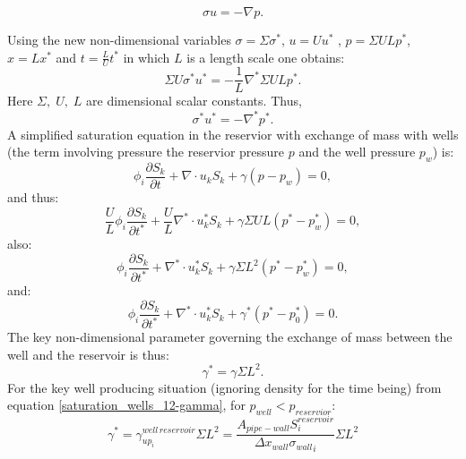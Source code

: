 \begin{equation}
\sigma u = -\nabla p.
\end{equation}

Using the new non-dimensional variables $\sigma=\Sigma \sigma^*$, $u=U u^*$ , $p=\Sigma U L p^*$,
$x=L x^*$
and $t=\frac{L}{U} t^*$ in which $L$ is a length scale
one
obtains:
\begin{equation}
\Sigma U \sigma^* u^* = -\frac{1}{L} \nabla^*  \Sigma U L p^*.
\end{equation}
Here $\Sigma,\; U,\; L$ are dimensional scalar constants.
Thus,
\begin{equation}
\sigma^* u^* = -\nabla^* p^*.
\end{equation}
A simplified saturation equation in the reservior with exchange of mass with wells (the term involving pressure the reservior pressure $p$ and the well pressure $p_w$) is:
\begin{equation}
\phi_i \frac{\partial S_k}{\partial t}
+ \nabla \cdot u_k S_k
+ \gamma (p-p_w)=0,
\end{equation}
and thus:
\begin{equation}
\frac{U}{L} \phi_i \frac{\partial S_k}{\partial t^*}
+ \frac{U}{L} \nabla^* \cdot u_k^* S_k
+ \gamma \Sigma U L  (p^*-p^*_w)=0,
\end{equation}
also:
\begin{equation}
\phi_i \frac{\partial S_k}{\partial t^*}
+ \nabla^* \cdot u_k^* S_k
+ \gamma \Sigma  L^2  (p^*-p^*_w)=0,
\end{equation}
and:
\begin{equation}
\phi_i \frac{\partial S_k}{\partial t^*}
+ \nabla^* \cdot u_k^* S_k
+ \gamma^* (p^*-p^*_0)=0.
\end{equation}
The key non-dimensional parameter governing the exchange of mass between
the well and the reservoir is thus:
\begin{equation}
\gamma^* = \gamma  \Sigma L^2.
\end{equation}
For the key well producing situation (ignoring density for the time being) from equation
\ref{saturation_wells_12-gamma},
for $p_{well}< p_{reservior}$:
\begin{equation}
\gamma^* = \gamma_{up_i}^{well\, reservoir}
  \Sigma L^2
=\frac{A_{pipe-wall}  S_i^{reservoir}   }
{{\Delta x}_{wall}{\sigma_{wall}}_i}
  \Sigma L^2
\end{equation}



